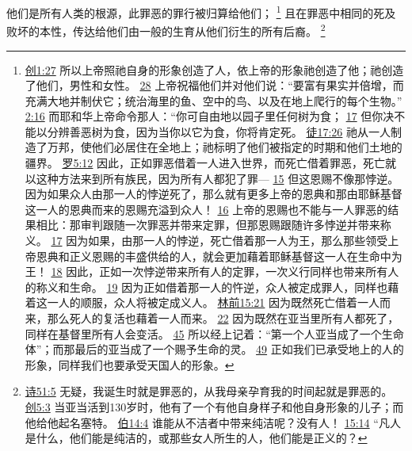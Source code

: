 \documentclass[12pt, a4paper, oneside]{ctexart}
\newcounter{parnum}[section]
\newcommand{\N}{%
   \noindent\refstepcounter{parnum}%
    \makebox[\parindent][l]{\textbf{\arabic{parnum}.}}}
\begin{document}
\N 他们是所有人类的根源，此罪恶的罪行被归算给他们；
	\footnote {
		\href{https://biblehub.com/genesis/1-27.htm}{创1:27} 所以上帝照祂自身的形象创造了人，依上帝的形象祂创造了他；祂创造了他们，男性和女性。
		\href{https://biblehub.com/genesis/1-28.htm}{28} 上帝祝福他们并对他们说：“要富有果实并倍增，而充满大地并制伏它；统治海里的鱼、空中的鸟、以及在地上爬行的每个生物。”
        \href{https://biblehub.com/genesis/2-16.htm}{2:16} 而耶和华上帝命令那人：“你可自由地以园子里任何树为食；
		\href{https://biblehub.com/genesis/2-17.htm}{17} 但你决不能以分辨善恶树为食，因为当你以它为食，你将肯定死。
		\href{https://biblehub.com/acts/17-26.htm}{徒17:26} 祂从一人制造了万邦，使他们必居住在全地上；祂标明了他们被指定的时期和他们土地的疆界。
		\href{https://biblehub.com/romans/5-12.htm}{罗5:12} 因此，正如罪恶借着一人进入世界，而死亡借着罪恶，死亡就以这种方法来到所有族民，因为所有人都犯了罪---
		\href{https://biblehub.com/romans/5-15.htm}{15} 但这恩赐不像那悖逆。因为如果众人由那一人的悖逆死了，那么就有更多上帝的恩典和那由耶稣基督这一人的恩典而来的恩赐充溢到众人！
		\href{https://biblehub.com/romans/5-16.htm}{16} 上帝的恩赐也不能与一人罪恶的结果相比：那审判跟随一次罪恶并带来定罪，但那恩赐跟随许多悖逆并带来称义。
		\href{https://biblehub.com/romans/5-17.htm}{17} 因为如果，由那一人的悖逆，死亡借着那一人为王，那么那些领受上帝恩典和正义恩赐的丰盛供给的人，就会更加藉着耶稣基督这一人在生命中为王！
		\href{https://biblehub.com/romans/5-18.htm}{18} 因此，正如一次悖逆带来所有人的定罪，一次义行同样也带来所有人的称义和生命。
		\href{https://biblehub.com/romans/5-19.htm}{19} 因为正如借着那一人的忤逆，众人被定成罪人，同样也藉着这一人的顺服，众人将被定成义人。
		\href{https://biblehub.com/1_corinthians/15-21.htm}{林前15:21} 因为既然死亡借着一人而来，那么死人的复活也藉着一人而来。
		\href{https://biblehub.com/1_corinthians/15-22.htm}{22} 因为既然在亚当里所有人都死了，同样在基督里所有人会变活。
		\href{https://biblehub.com/1_corinthians/15-45.htm}{45} 所以经上记着：“第一个人亚当成了一个生命体”；而那最后的亚当成了一个赐予生命的灵。
		\href{https://biblehub.com/1_corinthians/15-49.htm}{49} 正如我们已承受地上的人的形象，同样我们也要承受天国人的形象。
	}
	且在罪恶中相同的死及败坏的本性，传达给他们由一般的生育从他们衍生的所有后裔。
	\footnote {
		\href{https://biblehub.com/psalms/51-5.htm}{诗51:5} 无疑，我诞生时就是罪恶的，从我母亲孕育我的时间起就是罪恶的。
		\href{https://biblehub.com/genesis/5-3.htm}{创5:3} 当亚当活到130岁时，他有了一个有他自身样子和他自身形象的儿子；而他给他起名塞特。
		\href{https://biblehub.com/job/14-4.htm}{伯14:4} 谁能从不洁者中带来纯洁呢？没有人！
		\href{https://biblehub.com/job/15-14.htm}{15:14} “凡人是什么，他们能是纯洁的，或那些女人所生的人，他们能是正义的？
	}
\end{document}
